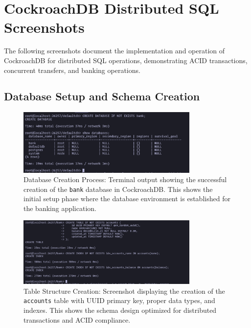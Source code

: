 \section{CockroachDB Distributed SQL Screenshots}

The following screenshots document the implementation and operation of CockroachDB for distributed SQL operations, demonstrating ACID transactions, concurrent transfers, and banking operations.

\subsection*{Database Setup and Schema Creation}

\begin{figure}[H]
  \centering
  \includegraphics[width=0.8\textwidth]{task-5/screenshots/create-db.png}
  \caption{Database Creation Process: Terminal output showing the successful creation of the \texttt{bank} database in CockroachDB. This shows the initial setup phase where the database environment is established for the banking application.}
  \label{fig:task5-create-db}
\end{figure}

\begin{figure}[H]
  \centering
  \includegraphics[width=0.8\textwidth]{task-5/screenshots/create-table.png}
  \caption{Table Structure Creation: Screenshot displaying the creation of the \texttt{accounts} table with UUID primary key, proper data types, and indexes. This shows the schema design optimized for distributed transactions and ACID compliance.}
  \label{fig:task5-create-table}
\end{figure}

